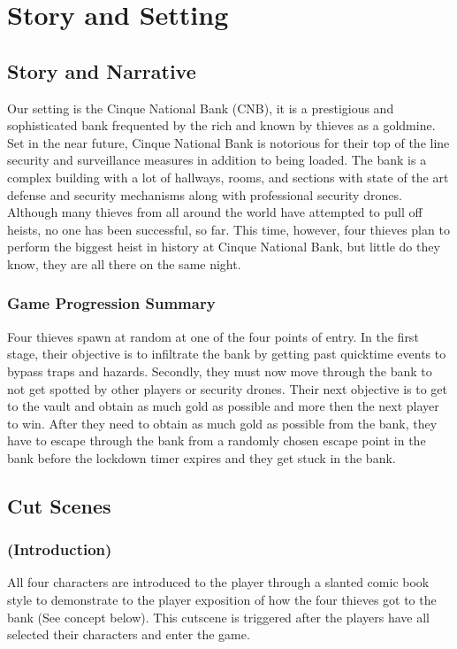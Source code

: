 \documentclass[14pt]{report}
\begin{document}
\chapter{Story and Setting}

\section{Story and Narrative}

Our setting is the Cinque National Bank (CNB), it is a prestigious and sophisticated bank frequented by the rich and known by thieves as a goldmine. Set in the near future, Cinque National Bank is notorious for their top of the line security and surveillance measures in addition to being loaded.  The bank is a complex building with a lot of hallways, rooms, and sections with state of the art defense and security mechanisms along with professional security drones. Although many thieves from all around the world have attempted to pull off heists, no one has been successful, so far. This time, however, four thieves plan to perform the biggest heist in history at Cinque National Bank, but little do they know, they are all there on the same night.

\subsection{Game Progression Summary}

Four thieves spawn at random at one of the four points of entry. In the first stage, their objective is to infiltrate the bank by getting past quicktime events to bypass traps and hazards. Secondly, they must now move through the bank to not get spotted by other players or security drones. 
Their next objective is to get to the vault and obtain as much gold as possible and more then the next player to win. After they need to obtain as much gold as possible from the bank, they have to escape through the bank from a randomly chosen escape point in the bank before the lockdown timer expires and they get stuck in the bank.

\section{Cut Scenes}
\subsection{(Introduction)}

All four characters are introduced to the player through a slanted comic book style to demonstrate to the player exposition of how the four thieves got to the bank (See concept below). This cutscene is triggered after the players have all selected their characters and enter the game.
\end{document}
